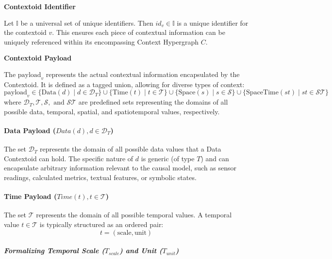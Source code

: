 \textbf{Contextoid Identifier}

Let \(\mathbb{I}\) be a universal set of unique identifiers.
Then \( id_v \in \mathbb{I} \) is a unique identifier for the contextoid \(v\). This ensures each piece of contextual information can be uniquely referenced within its encompassing Context Hypergraph \(C\).


\textbf{Contextoid Payload} 

The \( \text{payload}_v \) represents the actual contextual information encapsulated by the Contextoid. It is defined as a tagged union, allowing for diverse types of context:
\[ \text{payload}_v \in \{ \text{Data}(d) \mid d \in \mathcal{D}_T \} \cup \{ \text{Time}(t) \mid t \in \mathcal{T} \} \cup \{ \text{Space}(s) \mid s \in \mathcal{S} \} \cup \{ \text{SpaceTime}(st) \mid st \in \mathcal{ST} \} \]
where $\mathcal{D}_T, \mathcal{T}, \mathcal{S}, \text{ and } \mathcal{ST}$ are predefined sets representing the domains of all possible data, temporal, spatial, and spatiotemporal values, respectively.


            \paragraph[Data Payload]{Data Payload (\(Data(d), d \in \mathcal{D}_T\))}\label{par:data_payload}
            
            The set \(\mathcal{D}_T\) represents the domain of all possible data values that a Data Contextoid can hold. The specific nature of \(d\) is generic (of type \(T\)) and can encapsulate arbitrary information relevant to the causal model, such as sensor readings, calculated metrics, textual features, or symbolic states.


            \paragraph[Time Payload]{Time Payload (\(Time(t), t \in \mathcal{T}\))}\label{par:time_payload}
            
            The set \(\mathcal{T}\) represents the domain of all possible temporal values. A temporal value \(t \in \mathcal{T}\) is typically structured as an ordered pair:
            \[ t = (\text{scale}, \text{unit}) \]
            
                \subparagraph[Temporal Scale and Unit]{Formalizing Temporal Scale (\(T_{scale}\)) and Unit (\(T_{unit}\))}
                \label{subpar:temporal_scale_unit}
                
